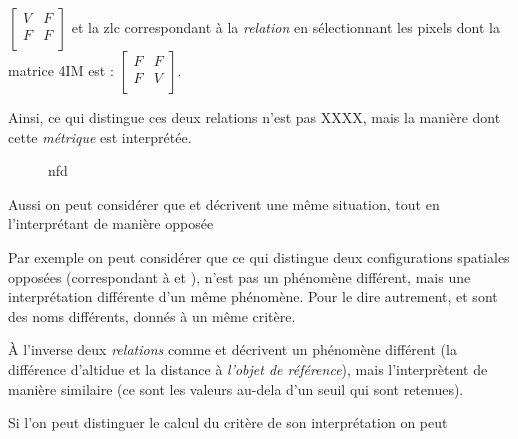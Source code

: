 \(\left[\begin{smallmatrix}V&F\\F&F\\\end{smallmatrix}\right]\) et la \ac{zlc} correspondant à la \emph{relation}  en sélectionnant les pixels dont la matrice 4IM est : \(\left[\begin{smallmatrix}F&F\\F&V\\\end{smallmatrix}\right]\).
%

Ainsi, ce qui distingue ces deux relations n'est pas XXXX, mais la manière dont cette \emph{métrique} est interprétée.

\begin{figure}
  \centering
  
  \caption{nfd}
  \label{fig:Exemple_Metrique_vs_Selecteur}
\end{figure}

%
Aussi on peut considérer que  et  décrivent une même situation, tout en l'interprétant de manière opposée

Par exemple on peut considérer que ce qui distingue deux configurations spatiales opposées (\eg correspondant à  et ), n'est pas un phénomène différent, mais une interprétation différente d'un même phénomène. Pour le dire autrement,  et  sont des noms différents, donnés à un même critère.

À l'inverse deux \emph{relations} comme  et  décrivent un phénomène différent (\ie la différence d'altidue et la distance à \emph{l'objet de référence}), mais l’interprètent de manière similaire (ce sont les valeurs au-dela d'un seuil qui sont retenues).

%
Si l'on peut distinguer le calcul du critère de son interprétation on peut

